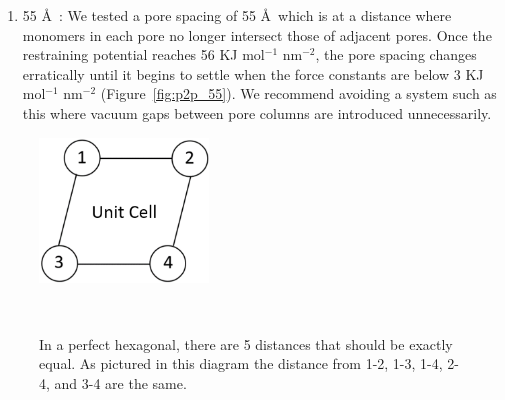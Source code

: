 \documentclass[journal=jpcbfk,manusciprt=article]{achemso}
\begin{document}
\begin{enumerate}
		\item 55 \AA~: We tested a pore spacing of 55 \AA~which is at
		a distance where monomers in each pore no longer intersect those of adjacent pores. Once
		the restraining potential reaches 56 KJ mol$^{-1}$ nm$^{-2}$, the pore spacing
		changes erratically until it begins to settle when the force constants are
		below 3 KJ mol$^{-1}$ nm$^{-2}$ (Figure~\ref{fig:p2p_55}). We recommend
		avoiding a system such as this where vacuum gaps between pore columns are
		introduced unnecessarily. %

	  \end{enumerate} 

	  \begin{figure}[!htb]
		\centering
		\includegraphics[width=0.4\textwidth]{p2p_diagram.png}
		\caption{In a perfect hexagonal, there are 5 distances that should be exactly
		equal. As pictured in this diagram the distance from 1-2, 1-3, 1-4, 2-4, and 3-4
		are the same.}~\label{fig:p2p_diagram}
	  \end{figure} 
\end{document}
